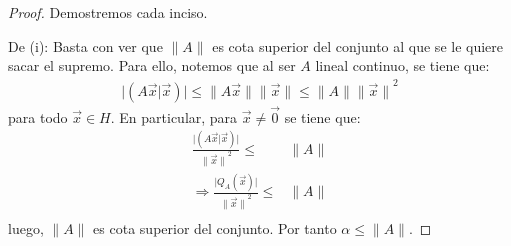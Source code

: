 \documentclass[12pt]{report}
\theoremstyle{largebreak}
\newcommand\abs[1]{\ensuremath{\big|#1\big|}}
\newcommand\pint[2]{\ensuremath{\left(#1\big|#2\right)}}
\newcommand\norm[1]{\ensuremath{\|#1\|}}
\begin{document}
    \begin{proof}
        Demostremos cada inciso.

        De (i): Basta con ver que $\norm{A}$ es cota superior del conjunto al que se le quiere sacar el supremo. Para ello, notemos que al ser $A$ lineal continuo, se tiene que:
        \begin{equation*}
            \begin{split}
                \abs{\pint{A\vec{x}}{\vec{x}}} \leq \norm{A\vec{x}}\norm{\vec{x}}\leq\norm{A}\norm{\vec{x}}^2
            \end{split}
        \end{equation*}
        para todo $\vec{x}\in H$. En particular, para $\vec{x}\neq\vec{0}$ se tiene que:
        \begin{equation*}
            \begin{split}
                \frac{\abs{\pint{A\vec{x}}{\vec{x}}}}{\norm{\vec{x}}^2}\leq&\norm{A}\\
                \Rightarrow \frac{\abs{Q_A(\vec{x})}}{\norm{\vec{x}}^2}\leq&\norm{A}\\
            \end{split}
        \end{equation*}
        luego, $\norm{A}$ es cota superior del conjunto. Por tanto $\alpha\leq\norm{A}$.


\end{proof}
\end{document}
